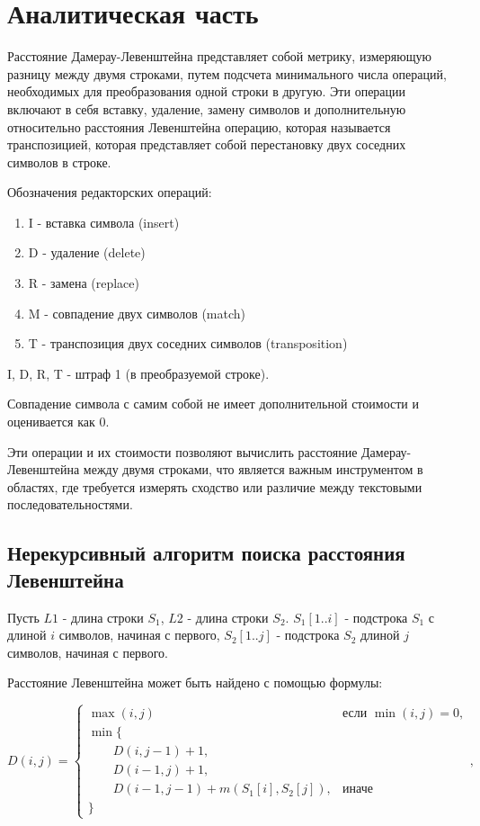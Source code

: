 \section{Аналитическая часть}

Расстояние Дамерау-Левенштейна представляет собой метрику, измеряющую разницу между двумя строками, путем подсчета минимального числа операций, необходимых для преобразования одной строки в другую. Эти операции включают в себя вставку, удаление, замену символов и дополнительную относительно расстояния Левенштейна операцию, которая называется транспозицией, которая представляет собой перестановку двух соседних символов в строке.

Обозначения редакторских операций:
\begin{enumerate}
	\item I - вставка символа (insert)
	\item D - удаление (delete)
	\item R - замена (replace)
	\item M - совпадение двух символов (match)
	\item T - транспозиция двух соседних символов (transposition)
\end{enumerate}
I, D, R, T - штраф 1 (в преобразуемой строке).

Совпадение символа с самим собой не имеет дополнительной стоимости и оценивается как 0.

Эти операции и их стоимости позволяют вычислить расстояние Дамерау-Левенштейна между двумя строками, что является важным инструментом в областях, где требуется измерять сходство или различие между текстовыми последовательностями.

\subsection{Нерекурсивный алгоритм поиска расстояния Левенштейна}
Пусть $L1$ - длина строки $S_{1}$, $L2$ - длина строки $S_{2}$. 
$S_{1}[1..i]$ - подстрока $S_{1}$ с длиной $i$ символов, начиная с первого, $S_{2}[1..j]$ - подстрока $S_{2}$ длиной $j$ символов, начиная с первого.

Расстояние Левенштейна может быть найдено с помощью формулы:

\begin{equation}
	\label{eq:d}
	D(i, j) = \begin{cases} 
		\max(i, j) &\text{если }\min(i, j) = 0, \\
		\min \lbrace \\
	     \qquad D(i, j-1) + 1, \\
	     \qquad D(i-1, j) + 1, \\
	     \qquad D(i-1, j-1) + m(S_{1}[i], S_{2}[j]), &\text{иначе} \\
	     \rbrace
	\end{cases},
\end{equation}

